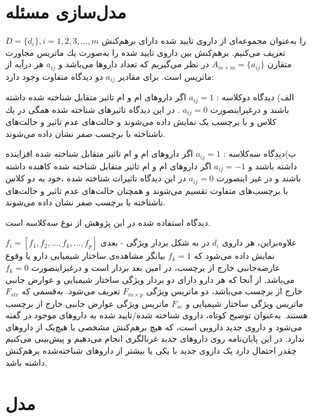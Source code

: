 \section{مدل‌سازی مسئله
\label{ProbelmDefine}} 

 
$D={\lbrace d_i \rbrace} , i=1,2,3,...,m$
را به‌عنوان مجموعه‌ای از
داروی تایید شده دارای برهم‌کنش تعریف می‌کنیم. برهم‌کنش بین
داروی تایید شده را به‌صورت یك ماتریس مجاورت متقارن
$A_{m\times m}={\lbrace a_{ij} \rbrace}$
در نظر می‌گیریم كه
تعداد داروها می‌باشد و
$a_{ij}$
هر درآیه از ماتریس
است. برای مقادیر 
$a_{ij}$
دو دیدگاه متفاوت وجود دارد: 


الف) دیدگاه دوکلاسه 
:
$a_{ij}=1$
 اگر دارو‌‌های 
ام و 
ام تاثیر متقابل شناخته شده داشته باشند و درغیراینصورت
$a_{ij}=0$
. در این دیدگاه تاثیر‌‌های شناخته شده همگی در یك كلاس و با برچسب یک نمایش داده می‌شوند و حالت‌‌های عدم تاثیر و حالت‌‌های ناشناخته با برچسب صفر نشان داده می‌شوند. 

ب)دیدگاه سه‌کلاسه
:
$a_{ij}=1$
 اگر دارو‌‌های 
ام و 
ام تاثیر متقابل شناخته شده افزاینده داشته باشند و 
$a_{ij}=-1$
اگر دارو‌‌های 
ام و 
ام تاثیر متقابل شناخته شده کاهنده داشته باشند و در غیر اینصورت
$a_{ij}=0$
در این دیدگاه تاثیرات شناخته شده ،خود به دو كلاس با برچسب‌‌های متفاوت تقسیم می‌شوند و همچنان حالت‌‌های عدم تاثیر و حالت‌‌‌های ناشناخته با برچسب صفر نشان داده می‌شوند. 

دیدگاه استفاده شده در این پژوهش از نوع سه‌کلاسه است. 

علاوه‌براین، هر داروی 
$d_i$
در
به‌ شکل بردار ویژگی
-
بعدی
$f_i = \left[  f_1, f_2, ... , f_k, ... , f_p \right]$
نمایش داده می‌شود که
$f_k = 1$
بیانگر مشاهده‌ی ساختار شیمیایی دارو یا وقوع عارضه‌جانبی خارج از برچسب، در
امین بعد بردار است و درغیراینصورت  
$f_k = 0$
می‌باشد. از آنجا که هر دارو دارای دو بردار ویژگی ساختار شیمیایی و عوارض جانبی خارج از برچسب می‌باشد، دو ماتریس ویژگی
$F_{m\times p}$
تعریف می‌شود. به‌قسمی که
 $F_{str}$
ماتریس ویژگی ساختار شیمیایی و 
$F_{se}$
 ماتریس ویژگی عوارض جانبی خارج از برچسب هستند. به‌عنوان توضیح کوتاه، داروی شناخته شده/تایید شده به داروهای موجود در
گفته می‌شود و داروی جدید دارویی است، که هیچ برهم‌کنش مشخصی  با هیچ‌یک از داروهای
ندارد. در این پایان‌نامه روی داروهای جدید غربالگری انجام می‌دهیم و پیش‌بینی می‌کنیم چقدر احتمال دارد یک داروی جدید با یکی یا بیشتر از داروهای شناخته‌شده برهم‌کنش داشته باشد. 

\section*{مدل
}

